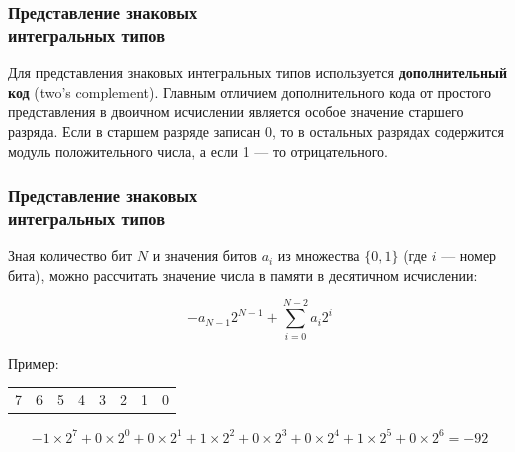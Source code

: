 \documentclass[compress, 8pt, aspectratio=169]{beamer}
\newenvironment{eightbit}{%
    \begin{center}
        \begin{tabular}{ |m{0.2cm}|m{0.2cm}|m{0.2cm}|m{0.2cm}|m{0.2cm}|m{0.2cm}|m{0.2cm}|m{0.2cm}|  }
            \hline
}{
        \hline
        \multicolumn{1}{c}{\color{gray}\tiny{7}} &
        \multicolumn{1}{c}{\color{gray}\tiny{6}} &
        \multicolumn{1}{c}{\color{gray}\tiny{5}} &
        \multicolumn{1}{c}{\color{gray}\tiny{4}} &
        \multicolumn{1}{c}{\color{gray}\tiny{3}} &
        \multicolumn{1}{c}{\color{gray}\tiny{2}} &
        \multicolumn{1}{c}{\color{gray}\tiny{1}} &
        \multicolumn{1}{c}{\color{gray}\tiny{0}} \\
        \end{tabular}
    \end{center}
}
\begin{document}
\begin{frame}[fragile]

    \frametitle{Представление знаковых \\ интегральных типов}

    Для представления знаковых интегральных типов используется
    \textbf{дополнительный код} (two's complement).
    Главным отличием дополнительного кода от простого представления
    в двоичном исчислении является особое значение старшего разряда.
    Если в старшем разряде записан 0, то в остальных разрядах
    содержится модуль положительного числа, а если 1 --- то
    отрицательного.

\end{frame}

\begin{frame}[fragile]

    \frametitle{Представление знаковых \\ интегральных типов}

    Зная количество бит \(N\) и значения битов \(a_i\) из множества
    \(\{0,1\}\) (где \(i\) --- номер бита), можно рассчитать значение
    числа в памяти в десятичном исчислении:

    \begin{displaymath}
        -a_{N-1} 2^{N-1} + \sum_{i=0}^{N-2}{a_i 2^i}
    \end{displaymath}

    Пример:

    \begin{eightbit}
        \cellcolor{yellow!40!white}{1}
        & \cellcolor{green!40!white}{0}
        & \cellcolor{green!40!white}{1}
        & \cellcolor{green!40!white}{0}
        & \cellcolor{green!40!white}{0}
        & \cellcolor{green!40!white}{1}
        & \cellcolor{green!40!white}{0}
        & \cellcolor{green!40!white}{0} \\
    \end{eightbit}

    \begin{displaymath}
        -1 \times 2^7 +
            0 \times 2^0 +
            0 \times 2^1 +
            1 \times 2^2 +
            0 \times 2^3 +
            0 \times 2^4 +
            1 \times 2^5 +
            0 \times 2^6
            = -92
    \end{displaymath}

\end{frame}
\end{document}
